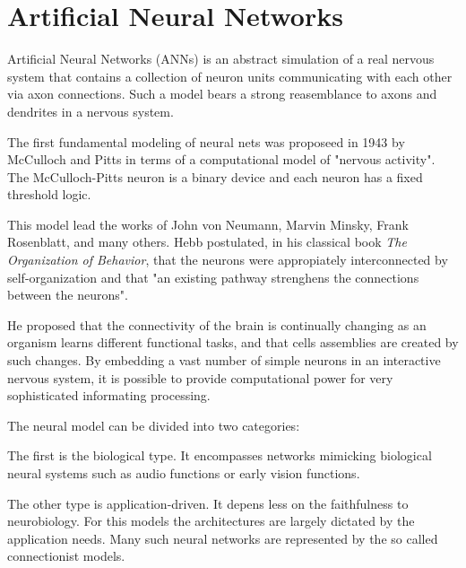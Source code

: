 \section{Artificial Neural Networks }

Artificial Neural Networks (ANNs) is an abstract simulation of a real nervous system that contains a collection of neuron units communicating with each other via axon connections. Such a model bears a strong reasemblance to axons and dendrites in a nervous system.


The first fundamental modeling of neural nets was proposeed in 1943 by McCulloch and Pitts in terms of a computational model of "nervous activity". The McCulloch-Pitts neuron is a binary device and each neuron has a fixed threshold logic. 


This model lead the works of John von Neumann, Marvin Minsky, Frank Rosenblatt, and many others. Hebb postulated, in his classical book \textit{The Organization of Behavior}, that the neurons were appropiately interconnected by self-organization and that "an existing pathway strenghens the connections between the neurons". 

He proposed that the connectivity of the brain is continually changing as an organism learns 
different functional tasks, and that cells assemblies are created by such changes. By embedding a vast number of simple neurons in an interactive nervous system, it is possible to provide computational power  for very sophisticated informating processing. 


The neural model can be divided into two categories:


The first is the biological type. It encompasses networks mimicking biological neural systems such as audio functions or early vision functions.

The other type is application-driven. It depens less on the faithfulness to neurobiology. For this models the architectures are largely dictated by the application needs. Many such neural networks are represented by the so called connectionist models.

